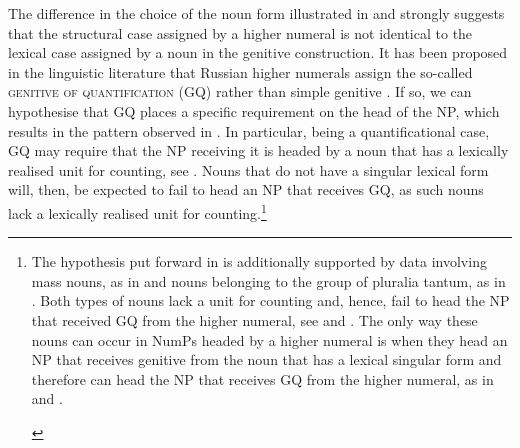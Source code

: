 \documentclass[output=paper,
modfonts,
newtxmath,
hidelinks
]{langscibook}
\begin{document}
\noindent The difference in the choice of the noun form illustrated in  and  strongly suggests that the structural case assigned by a higher numeral is not identical to the lexical case assigned by a noun in the genitive construction. It has been proposed in the linguistic literature that Russian higher numerals assign the so-called \textsc{genitive of quantification} (GQ) rather than simple genitive \citep{Bošković2006}. If so, we can hypothesise that GQ places a specific requirement on the head of the NP, which results in the pattern observed in . In particular, being a quantificational case, GQ may require that the NP receiving it is headed by a noun that has a lexically realised unit for counting, see . Nouns that do not have a singular lexical form will, then, be expected to fail to head an NP that receives GQ, as such nouns lack a lexically realised unit for counting.\footnote{\label{fn4}The hypothesis put forward in  is additionally supported by data involving mass nouns, as in  and nouns belonging to the group of pluralia tantum, as in . Both types of nouns lack a unit for counting and, hence, fail to head the NP that received GQ from the higher numeral, see  and . The only way these nouns can occur in NumPs headed by a higher numeral is when they head an NP that receives genitive from the noun that has a lexical singular form and therefore can head the NP that receives GQ from the higher numeral, as in  and .

\begin{multicols}{2}
\ea \label{fn4i}
	\label{fn4ia}
    \label{fn4ib}
    \z
\z

\columnbreak

\ea \label{fn4ii}
	\label{fn4iia}
    \label{fn4iib}
    \z
\z


\end{multicols}}
\end{document}

